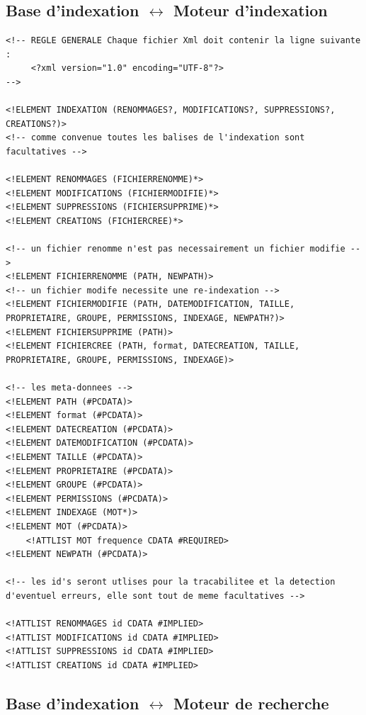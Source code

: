 \documentclass[a4paper,12pt]{report}
\begin{document}
\subsection{Base d'indexation $\leftrightarrow$ Moteur d'indexation}\label{dtd_bi_mi}
\begin{lstlisting}[frame=single]
<!-- REGLE GENERALE Chaque fichier Xml doit contenir la ligne suivante :
     <?xml version="1.0" encoding="UTF-8"?>
-->

<!ELEMENT INDEXATION (RENOMMAGES?, MODIFICATIONS?, SUPPRESSIONS?, CREATIONS?)>
<!-- comme convenue toutes les balises de l'indexation sont facultatives -->

<!ELEMENT RENOMMAGES (FICHIERRENOMME)*>
<!ELEMENT MODIFICATIONS (FICHIERMODIFIE)*>
<!ELEMENT SUPPRESSIONS (FICHIERSUPPRIME)*>
<!ELEMENT CREATIONS (FICHIERCREE)*>

<!-- un fichier renomme n'est pas necessairement un fichier modifie -->
<!ELEMENT FICHIERRENOMME (PATH, NEWPATH)>
<!-- un fichier modife necessite une re-indexation -->
<!ELEMENT FICHIERMODIFIE (PATH, DATEMODIFICATION, TAILLE, PROPRIETAIRE, GROUPE, PERMISSIONS, INDEXAGE, NEWPATH?)>
<!ELEMENT FICHIERSUPPRIME (PATH)>
<!ELEMENT FICHIERCREE (PATH, format, DATECREATION, TAILLE, PROPRIETAIRE, GROUPE, PERMISSIONS, INDEXAGE)>

<!-- les meta-donnees -->
<!ELEMENT PATH (#PCDATA)>
<!ELEMENT format (#PCDATA)>
<!ELEMENT DATECREATION (#PCDATA)>
<!ELEMENT DATEMODIFICATION (#PCDATA)>
<!ELEMENT TAILLE (#PCDATA)>
<!ELEMENT PROPRIETAIRE (#PCDATA)>
<!ELEMENT GROUPE (#PCDATA)>
<!ELEMENT PERMISSIONS (#PCDATA)>
<!ELEMENT INDEXAGE (MOT*)>
<!ELEMENT MOT (#PCDATA)>
	<!ATTLIST MOT frequence CDATA #REQUIRED>
<!ELEMENT NEWPATH (#PCDATA)>

<!-- les id's seront utlises pour la tracabilitee et la detection d'eventuel erreurs, elle sont tout de meme facultatives -->

<!ATTLIST RENOMMAGES id CDATA #IMPLIED>
<!ATTLIST MODIFICATIONS id CDATA #IMPLIED>
<!ATTLIST SUPPRESSIONS id CDATA #IMPLIED>
<!ATTLIST CREATIONS id CDATA #IMPLIED>
\end{lstlisting}

\newpage
\subsection{Base d'indexation $\leftrightarrow$ Moteur de recherche}
\end{document}
